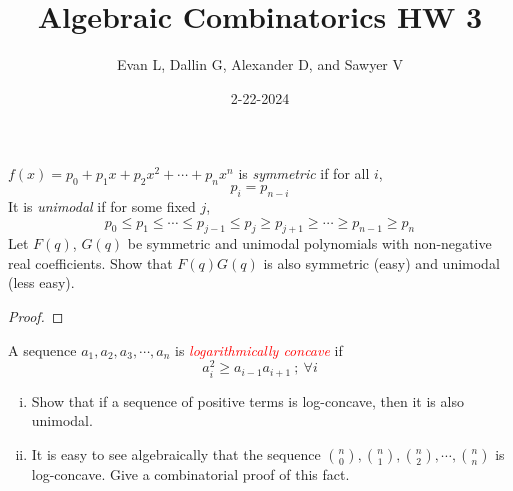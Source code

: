 \documentclass[11pt]{scrartcl}
\title{Algebraic Combinatorics HW 3}
\author{Evan L, Dallin G, Alexander D, and Sawyer V}
\date{2-22-2024}
\begin{document}
\maketitle
\setcounter{section}{1}
\begin{problem}
    $f(x)= p_0 + p_1x + p_2x^2 + \cdots + p_nx^n$ is \textit{symmetric} if for all $i$, $$p_i=p_{n-i}$$ It is \textit{unimodal} if for some fixed $j$, $$p_0\le p_1\le \cdots \le p_{j-1}\le p_j \ge p_{j+1}\ge \cdots \ge p_{n-1}\ge p_n$$ Let $F(q)$, $G(q)$ be symmetric and unimodal polynomials with non-negative real coefficients. Show that $F(q)G(q)$ is also symmetric (easy) and unimodal (less easy).
\end{problem}
\begin{proof}
\end{proof}

\begin{problem}[\textcolor{red}{Log-concavity of Binomial coefficients}]
    A sequence $a_1,a_2, a_3, \cdots, a_n$ is \textcolor{red}{\textit{logarithmically concave}} if $$a_i^2\ge a_{i-1}a_{i+1}~;~ \forall i$$

    \begin{enumerate}[(i)]
        \item Show that if a sequence of positive terms is log-concave, then it is also unimodal.\smallskip
        \item It is easy to see algebraically that the sequence $\binom{n}{0},\binom{n}{1}, \binom{n}{2}, \cdots, \binom{n}{n}$ is log-concave. Give a combinatorial proof of this fact.
    \end{enumerate}
\end{problem}
\end{document}
